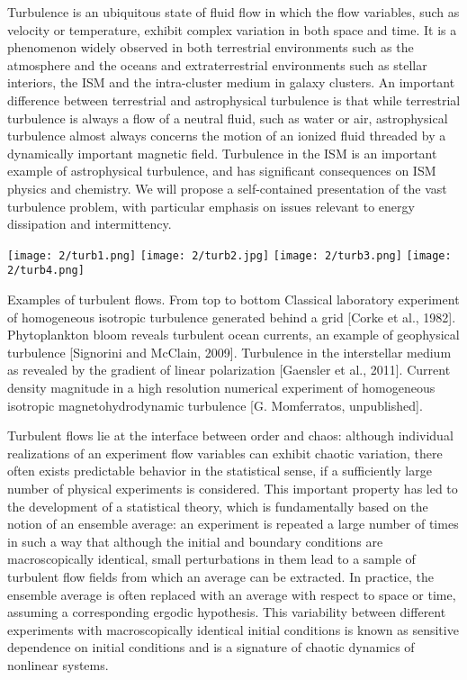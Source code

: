 Turbulence is an ubiquitous state of fluid flow in which the flow variables, such as velocity or temperature, exhibit complex variation in both space and time. It is a phenomenon widely observed in both terrestrial
environments such as the atmosphere and the oceans and extraterrestrial environments such as stellar interiors, the ISM and the intra-cluster medium in galaxy clusters. 
An important difference between
terrestrial and astrophysical turbulence is that while terrestrial turbulence is always a flow of a neutral fluid, such as water or air, astrophysical turbulence almost always concerns the motion of an ionized fluid threaded
by a dynamically important magnetic field. Turbulence in the ISM is an important example of astrophysical turbulence, and has significant consequences on ISM physics and chemistry.
We will propose a self-contained presentation of the vast turbulence problem, with particular emphasis on issues relevant to energy dissipation and intermittency.
\begin{marginfigure}[0.5cm]
\texttt{[image: 2/turb1.png]}\vspace{.25\baselineskip}
\texttt{[image: 2/turb2.jpg]}\vspace{.25\baselineskip}
\texttt{[image: 2/turb3.png]}\vspace{.25\baselineskip}
\texttt{[image: 2/turb4.png]}
\caption{Examples of turbulent flows. From top to bottom Classical laboratory experiment of homogeneous isotropic
turbulence generated behind a grid [Corke et al., 1982].
Phytoplankton bloom reveals turbulent ocean currents, an example of geophysical turbulence [Signorini and McClain, 2009].  Turbulence
in the interstellar medium as revealed by the gradient of linear polarization [Gaensler et al., 2011]. Current density magnitude in a high resolution numerical experiment of homogeneous isotropic
magnetohydrodynamic turbulence [G. Momferratos, unpublished].}
\end{marginfigure}
Turbulent flows lie at the interface between order and chaos: although individual realizations of an experiment flow variables can exhibit chaotic variation, there often exists predictable behavior in the statistical sense,
if a sufficiently large number of physical experiments is considered. This important property has led to the development of a statistical theory, which is fundamentally based on the notion of an ensemble average: an experiment is repeated a large number of times in such a way that although the initial and boundary conditions are macroscopically identical, small perturbations in them lead to a sample of turbulent flow fields from which an average can be extracted. In practice, the ensemble average is often replaced with an average
with respect to space or time, assuming a corresponding ergodic hypothesis.
This variability between different experiments with macroscopically identical initial conditions is known as sensitive dependence on initial conditions and is a signature of chaotic dynamics of nonlinear systems. 

